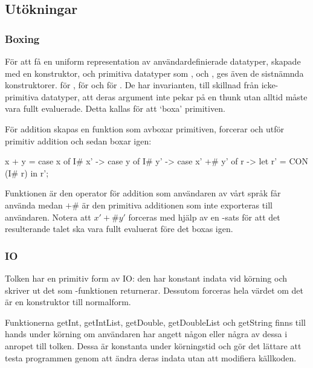 \documentclass[../Core]{subfiles}
\begin{document}
\subsection{Utökningar}

\subsubsection{Boxing}

För att få en uniform representation av användardefinierade datatyper, skapade
med en konstruktor, och primitiva datatyper som ,  och , ges även 
de sistnämnda konstruktorer.  för ,  för  och 
 för . De har invarianten, till skillnad från icke-primitiva datatyper, 
att deras argument inte pekar på en thunk utan alltid måste vara fullt evaluerade. 
Detta kallas för att `boxa' primitiven.

    För addition skapas en funktion som avboxar primitiven,
forcerar och utför primitiv addition och sedan boxar igen:

\begin{codeEx}
x + y = case x of 
    { I# x' -> case y of
        { I# y' -> case x' +# y' of
            { r -> let r' = CON (I# r) in  r'}}};
\end{codeEx}

Funktionen \ic{+} är den operator för addition som användaren av vårt språk får använda medan $ +\# $ är den
primitiva additionen som inte exporteras till användaren. Notera att $ x' +\# y' $
forceras med hjälp av en -sats för att det resulterande talet ska vara fullt
evaluerat före det boxas igen.

\subsubsection{IO}
Tolken har en primitiv form av IO: den har konstant indata vid körning och
skriver ut det som -funktionen returnerar. Dessutom
forceras hela värdet om det är en konstruktor till normalform.

Funktionerna getInt, getIntList, getDouble, getDoubleList och getString finns
till hands under körning om användaren har angett någon eller några av dessa
i anropet till tolken. Dessa är konstanta under körningstid och gör det
lättare att testa programmen genom att ändra deras indata utan att modifiera
källkoden.
\end{document}
